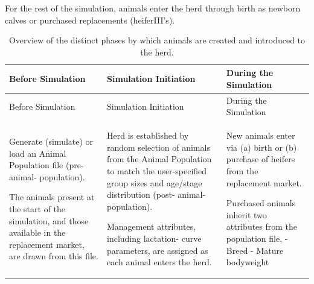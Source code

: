 \documentclass[
  letterpaper,
  oneside,
  openany]{scrbook}
\begin{document}
For the rest of the simulation, animals enter the herd through birth as
newborn calves or purchased replacements (heiferIII's).

\begin{longtable}[]{@{}
  >{\raggedright\arraybackslash}p{}
  >{\raggedright\arraybackslash}p{}
  >{\raggedright\arraybackslash}p{}@{}}
\caption{Overview of the distinct phases by which animals are created
and introduced to the herd.}\label{tbl-animal-simulation}\tabularnewline
\toprule\noalign{}
\begin{minipage}[b]{\linewidth}\raggedright
Before Simulation
\end{minipage} & \begin{minipage}[b]{\linewidth}\raggedright
Simulation Initiation
\end{minipage} & \begin{minipage}[b]{\linewidth}\raggedright
During the Simulation
\end{minipage} \\
\midrule\noalign{}
\endfirsthead
\toprule\noalign{}
\begin{minipage}[b]{\linewidth}\raggedright
Before Simulation
\end{minipage} & \begin{minipage}[b]{\linewidth}\raggedright
Simulation Initiation
\end{minipage} & \begin{minipage}[b]{\linewidth}\raggedright
During the Simulation
\end{minipage} \\
\midrule\noalign{}
\endhead
\bottomrule\noalign{}
\endlastfoot
Generate (simulate) or load an Animal Population file (pre-animal-
population).

The animals present at the start of the simulation, and those available
in the replacement market, are drawn from this file. & Herd is
established by random selection of animals from the Animal Population to
match the user-specified group sizes and age/stage distribution (post-
animal-population).

Management attributes, including lactation- curve parameters, are
assigned as each animal enters the herd. & New animals enter via (a)
birth or (b) purchase\textbar{} of heifers from the \textbar{}
replacement market.

Purchased animals inherit\textbar{} two attributes from the \textbar{}
population file, \textbar{} - Breed \textbar{} - Mature bodyweight
\textbar{} \\
\end{longtable}
\end{document}
